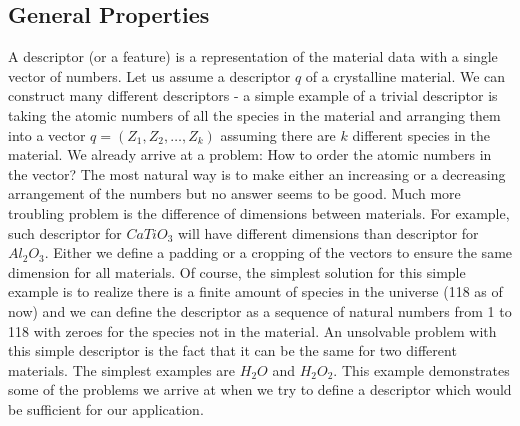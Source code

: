 \documentclass[11pt,oneside,czech,american]{book} %
\theoremstyle{definition} %
\theoremstyle{definition}
\begin{document}
\subsection{General Properties} \label{gen}
A descriptor (or a feature) is a representation of the material data with a single vector of numbers. Let us assume a descriptor $q$ of a crystalline material. We can construct many different descriptors - a simple example of a trivial descriptor is taking the atomic numbers of all the species in the material and arranging them into a vector $q = (Z_1, Z_2, \dots, Z_k)$ assuming there are $k$ different species in the material. We already arrive at a problem: How to order the atomic numbers in the vector? The most natural way is to make either an increasing or a decreasing arrangement of the numbers but no answer seems to be good. Much more troubling problem is the difference of dimensions between materials. For example, such descriptor for $CaTiO_3$ will have different dimensions than descriptor for $Al_2 O_3$. Either we define a padding or a cropping of the vectors to ensure the same dimension for all materials. Of course, the simplest solution for this simple example is to realize there is a finite amount of species in the universe (118 as of now) and we can define the descriptor as a sequence of natural numbers from 1 to 118 with zeroes for the species not in the material. An unsolvable problem with this simple descriptor is the fact that it can be the same for two different materials. The simplest examples are $H_2 O$ and $H_2 O_2$. This example demonstrates some of the problems we arrive at when we try to define a descriptor which would be sufficient for our application.
\end{document}
